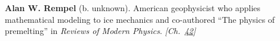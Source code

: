 \textbf{Alan W. Rempel} (b. unknown). American geophysicist who applies mathematical modeling to ice mechanics and co-authored ``The physics of premelting'' in \emph{Reviews of Modern Physics}. \emph{[Ch.~\hyperref[ch:iceslipperiness]{42}]}

